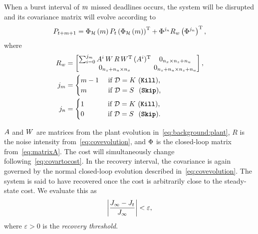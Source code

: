 When a burst interval of $m$ missed deadlines occurs, the system will be disrupted and its covariance matrix will evolve according to
%
\begin{equation}
\label{eq:covariance-evolution}
    P_{t+\nummisses+1} = \clmat{}_{\strat}\funof{m} P_t \left( \clmat{}_{\strat}\funof{m} \right)^\T + \clmat{}^{j_{\numhits}} R_w \left( \clmat{}^{j_{\numhits}} \right)^\T,
\end{equation}
where
\begin{equation}
\label{eq:evolutionparameters}
\setlength\arraycolsep{2pt}
    \begin{aligned}
        R_w &= 
        \begin{bmatrix} 
            \sum_{i=0}^{j_{\nummisses}} \Ap^i\,\Wp\,R\,\Wp^\T\,(\Ap^i)^\T & 0_{n_x \times n_z+n_u} \\ 
            0_{n_z + n_u \times n_x}               & 0_{n_z + n_u \times n_z+ n_u}
        \end{bmatrix}, \\
        j_{\nummisses} &= 
        \begin{cases} 
            \nummisses - 1 & \text{ if } \dstrat = K\,\, \text{(\tK{}),} \\ 
            \nummisses & \text{ if } \dstrat = S\,\,\,\, \text{(\tS{}),} 
        \end{cases} \\
        j_{\numhits} &= 
        \begin{cases} 
            1 \phantom{||222} & \text{ if } \dstrat = K\,\, \text{(\tK{}),} \\ 
            0 & \text{ if } \dstrat = S\,\,\,\, \text{(\tS{}).}
        \end{cases}
        \end{aligned}
\end{equation}

$A$ and $W$ are matrices from the plant evolution in~\eqref{eq:background:plant}, $R$ is the noise intensity from~\eqref{eq:covevolution}, and $\Phi{}$ is the closed-loop matrix from~\eqref{eq:matrixA}.
The cost will simultaneously change following~\eqref{eq:covartocost}.
In the recovery interval, the covariance is again governed by the normal closed-loop evolution described in~\eqref{eq:covevolution}.
The system is said to have recovered once the cost is arbitrarily close to the steady-state cost.
We evaluate this as
%
\begin{equation}
    \label{eq:cost-threshold}
    \abs{\frac{J_{\infty}-J_t}{J_\infty}} < \varepsilon,
\end{equation}
where $\varepsilon> 0$ is the \emph{recovery threshold}.

